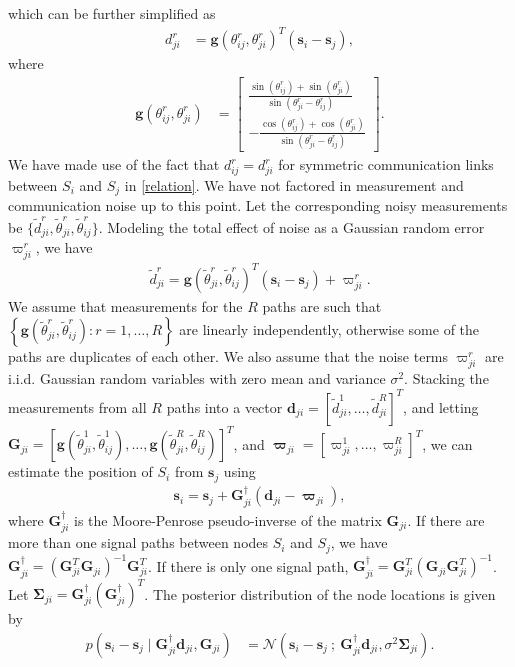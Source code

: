 \documentclass[10pt, twocolumn, final]{IEEEtran}
\newcommand{\bSigma}{\mathbf{\Sigma}}
\newcommand{\N}[2]{{\mathcal{N}\left(#1\ ;\ #2\right)}}
\begin{document}
which can be further simplified as
\begin{align}\label{relation}
d_{ji}^{r} & =
\mathbf{g}(\theta_{ij}^r, \theta_{ji}^r)^{T} \left(\mathbf{s}_i - \mathbf{s}_j\right),
\end{align}
where
\begin{align*}
\mathbf{g}(\theta_{ij}^r, \theta_{ji}^r) & =
\begin{bmatrix}
\frac{\sin(\theta_{ij}^{r}) + \sin(\theta_{ji}^{r})}{\sin(\theta_{ji}^{r} - \theta_{ij}^{r})} \\
-\frac{\cos(\theta_{ij}^{r}) + \cos(\theta_{ji}^{r})}{\sin(\theta_{ji}^{r} - \theta_{ij}^{r})}
\end{bmatrix}.
\end{align*}
We have made use of the fact that $d_{ij}^r = d_{ji}^r$ for symmetric communication links between $S_i$ and $S_j$ in \eqref{relation}. We have not factored in measurement and communication noise up to this point. Let the corresponding noisy measurements be $\{\tilde{d}_{ji}^r, \tilde{\theta}_{ji}^r, \tilde{\theta}_{ij}^r\}$. Modeling the total effect of noise as a Gaussian random error $\varpi_{ji}^r$, we have
\begin{align}
\tilde{d}_{ji}^r = \mathbf{g}\left(\tilde{\theta}_{ji}^r, \tilde{\theta}_{ij}^r\right)^{T}\left(\mathbf{s}_i - \mathbf{s}_j\right) + \varpi_{ji}^r.
\end{align}
We assume that measurements for the $R$ paths are such that $\left\{\mathbf{g}\left(\tilde{\theta}_{ji}^r, \tilde{\theta}_{ij}^r\right): r=1,\ldots,R\right\}$ are linearly independently, otherwise some of the paths are duplicates of each other. We also assume that the noise terms $\varpi_{ji}^r$ are i.i.d. Gaussian random variables with zero mean and variance $\sigma^2$. Stacking the measurements from all $R$ paths into a vector $\mathbf{d}_{ji} = [\tilde{d}_{ji}^1, \ldots, \tilde{d}_{ji}^R]^T$, and letting $\mathbf{G}_{ji} = \left[\mathbf{g}\left(\tilde{\theta}_{ji}^1, \tilde{\theta}_{ij}^1\right), \ldots, \mathbf{g}\left(\tilde{\theta}_{ji}^R, \tilde{\theta}_{ij}^R\right)\right]^T$, and $\bm{\varpi}_{ji} = [\varpi_{ji}^1,\ldots,\varpi_{ji}^R]^T$, we can estimate the position of $S_i$ from $\mathbf{s}_j$ using
\begin{align}
\mathbf{s}_i = \mathbf{s}_j + \mathbf{G}_{ji}^{\dagger}\left(\mathbf{d}_{ji} - \bm{\varpi}_{ji}\right), \label{si-sj}
\end{align}
where $\mathbf{G}_{ji}^{\dagger}$ is the Moore-Penrose pseudo-inverse of the matrix $\mathbf{G}_{ji}$. If there are more than one signal paths between nodes $S_i$ and $S_j$, we have $\mathbf{G}_{ji}^{\dagger} = \left(\mathbf{G}_{ji}^T\mathbf{G}_{ji}\right)^{-1}\mathbf{G}_{ji}^T$. If there is only one signal path, $\mathbf{G}_{ji}^{\dagger} = \mathbf{G}_{ji}^T\left(\mathbf{G}_{ji}\mathbf{G}_{ji}^T\right)^{-1}$. Let $\bSigma_{ji} = \mathbf{G}_{ji}^{\dagger} (\mathbf{G}_{ji}^{\dagger})^T$. The posterior distribution of the node locations is given by
\begin{align*}
p(\mathbf{s}_i - \mathbf{s}_j \mid \mathbf{G}_{ji}^{\dagger}\mathbf{d}_{ji}, \mathbf{G}_{ji})
& = \N{\mathbf{s}_i - \mathbf{s}_j}{\mathbf{G}_{ji}^{\dagger}\mathbf{d}_{ji}, \sigma^2\bSigma_{ji}}.
\end{align*}
\end{document}
